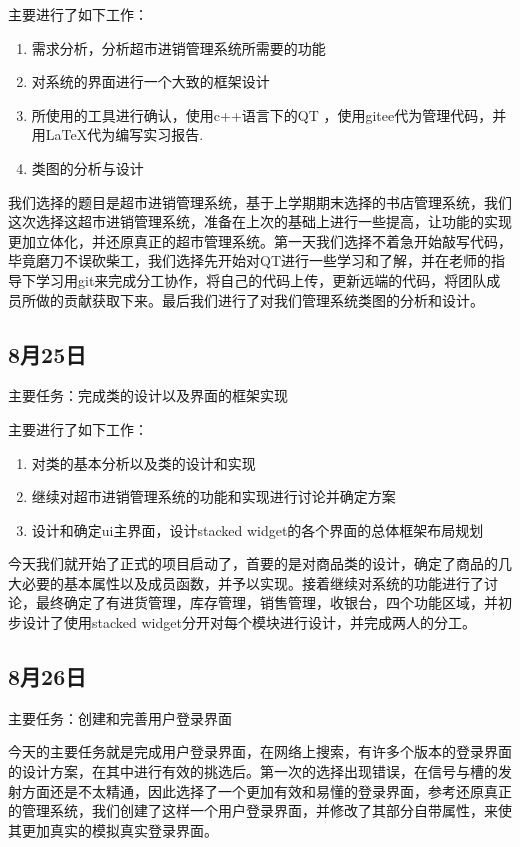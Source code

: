 \documentclass[
   projtype=report, %
   output=print,     %
  ]{nwafuprojrep}
\begin{document}
主要进行了如下工作：
\begin{enumerate}
	\item 需求分析，分析超市进销管理系统所需要的功能
	\item 对系统的界面进行一个大致的框架设计
	\item 所使用的工具进行确认，使用c++语言下的QT ，使用gitee代为管理代码，并用\LaTeX 代为编写实习报告.
	\item 类图的分析与设计
\end{enumerate}


我们选择的题目是超市进销管理系统，基于上学期期末选择的书店管理系统，我们这次选择这超市进销管理系统，准备在上次的基础上进行一些提高，让功能的实现更加立体化，并还原真正的超市管理系统。第一天我们选择不着急开始敲写代码，毕竟磨刀不误砍柴工，我们选择先开始对QT进行一些学习和了解，并在老师的指导下学习用git来完成分工协作，将自己的代码上传，更新远端的代码，将团队成员所做的贡献获取下来。最后我们进行了对我们管理系统类图的分析和设计。
\subsection{8月25日}
主要任务：完成类的设计以及界面的框架实现

主要进行了如下工作：
\begin{enumerate}
	\item 对类的基本分析以及类的设计和实现
	\item 继续对超市进销管理系统的功能和实现进行讨论并确定方案
	\item 设计和确定ui主界面，设计stacked widget的各个界面的总体框架布局规划
\end{enumerate}


今天我们就开始了正式的项目启动了，首要的是对商品类的设计，确定了商品的几大必要的基本属性以及成员函数，并予以实现。接着继续对系统的功能进行了讨论，最终确定了有进货管理，库存管理，销售管理，收银台，四个功能区域，并初步设计了使用stacked widget分开对每个模块进行设计，并完成两人的分工。

\subsection{8月26日}
主要任务：创建和完善用户登录界面

	今天的主要任务就是完成用户登录界面，在网络上搜索，有许多个版本的登录界面的设计方案，在其中进行有效的挑选后。第一次的选择出现错误，在信号与槽的发射方面还是不太精通，因此选择了一个更加有效和易懂的登录界面，参考还原真正的管理系统，我们创建了这样一个用户登录界面，并修改了其部分自带属性，来使其更加真实的模拟真实登录界面。
\end{document}
